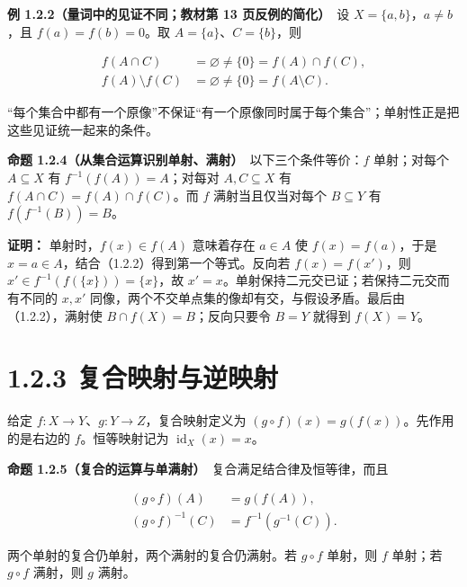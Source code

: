 \documentclass[11pt,a4paper]{article}
\begin{document}
\textbf{例 1.2.2（量词中的见证不同；教材第 13 页反例的简化）}　设
\(X=\{a,b\}\)，\(a\ne b\)，且 \(f(a)=f(b)=0\)。取
\(A=\{a\}\)、\(C=\{b\}\)，则

\begin{equation*}
\begin{aligned}
f(A\cap C)&=\varnothing\ne\{0\}=f(A)\cap f(C),\\
f(A)\setminus f(C)&=\varnothing\ne\{0\}=f(A\setminus C).
\end{aligned}\tag{1.2.6}
\end{equation*}

``每个集合中都有一个原像''不保证``有一个原像同时属于每个集合''；单射性正是把这些见证统一起来的条件。

\textbf{命题 1.2.4（从集合运算识别单射、满射）}　以下三个条件等价：\(f\)
单射；对每个 \(A\subseteq X\) 有 \(f^{-1}(f(A))=A\)；对每对
\(A,C\subseteq X\) 有 \(f(A\cap C)=f(A)\cap f(C)\)。而 \(f\)
满射当且仅当对每个 \(B\subseteq Y\) 有 \(f(f^{-1}(B))=B\)。

\textbf{证明：} 单射时，\(f(x)\in f(A)\) 意味着存在 \(a\in A\) 使
\(f(x)=f(a)\)，于是 \(x=a\in A\)，结合（1.2.2）得到第一个等式。反向若
\(f(x)=f(x')\)，则 \(x'\in f^{-1}(f(\{x\}))=\{x\}\)，故
\(x'=x\)。单射保持二元交已证；若保持二元交而有不同的 \(x,x'\)
同像，两个不交单点集的像却有交，与假设矛盾。最后由（1.2.2），满射使
\(B\cap f(X)=B\)；反向只要令 \(B=Y\) 就得到 \(f(X)=Y\)。

\section[\S{}1.2.3
复合映射与逆映射]{1.2.3
复合映射与逆映射}\label{ux590dux5408ux6620ux5c04ux4e0eux9006ux6620ux5c04}

给定 \(f:X\to Y\)、\(g:Y\to Z\)，复合映射定义为
\((g\circ f)(x)=g(f(x))\)。先作用的是右边的 \(f\)。恒等映射记为
\(\operatorname{id}_X(x)=x\)。

\textbf{命题 1.2.5（复合的运算与单满射）}　复合满足结合律及恒等律，而且

\begin{equation*}
\begin{aligned}
(g\circ f)(A)&=g(f(A)),\\
(g\circ f)^{-1}(C)&=f^{-1}(g^{-1}(C)).
\end{aligned}\tag{1.2.7}
\end{equation*}

两个单射的复合仍单射，两个满射的复合仍满射。若 \(g\circ f\) 单射，则
\(f\) 单射；若 \(g\circ f\) 满射，则 \(g\) 满射。
\end{document}
